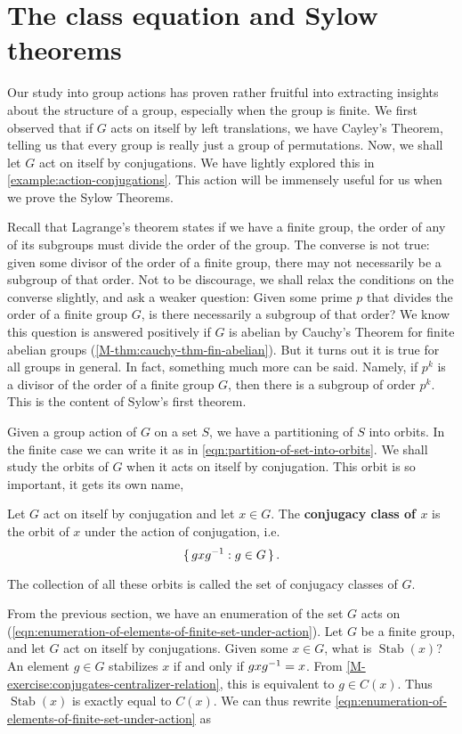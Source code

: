\documentclass[./main.tex]{subfiles}
\begin{document}
\section{The class equation and Sylow theorems}
Our study into group actions has proven rather fruitful into extracting insights
about the structure of a group, especially when the group is finite. We first
observed that if $G$ acts on itself by left translations, we have Cayley's
Theorem, telling us that every group is really just a group of permutations.
Now, we shall let $G$ act on itself by conjugations. We have lightly explored
this in \cref{example:action-conjugations}. This action will be immensely useful
for us when we prove the Sylow Theorems. 

Recall that Lagrange's theorem states if we have a finite group, the order of
any of its subgroups must divide the order of the group. The converse is not
true: given some divisor of the order of a finite group, there may not
necessarily be a subgroup of that order. Not to be discourage, we shall relax
the conditions on the converse slightly, and ask a weaker question: Given some
prime $p$ that divides the order of a finite group $G$, is there necessarily a
subgroup of that order? We know this question is answered positively if $G$ is
abelian by Cauchy's Theorem for finite abelian groups
(\cref{M-thm:cauchy-thm-fin-abelian}). But it turns out it is true for all groups
in general. In fact, something much more can be said. Namely, if $p^k$ is a
divisor of the order of a finite group $G$, then there is a subgroup of order
$p^k$. This is the content of Sylow's first theorem.

Given a group action of $G$ on a set $S$, we have a partitioning of $S$ into
orbits. In the finite case we can write it as in
\cref{eqn:partition-of-set-into-orbits}. We shall study the orbits of $G$ when
it acts on itself by conjugation. This orbit is so important, it gets its own name,
\begin{definition}
\label{def:conjugacy-class}
    Let $G$ act on itself by conjugation and let $x \in G$. The
    \textbf{conjugacy class of $x$} is the orbit of $x$ under the action of
    conjugation, i.e. 
    \[
        \set{gxg^{-1}: g \in G}.
    \]
\end{definition}
The collection of all these orbits is called the set of conjugacy classes of
$G$.

From the previous section, we have an enumeration of the set $G$ acts on
(\cref{eqn:enumeration-of-elements-of-finite-set-under-action}). Let $G$ be a
finite group, and let $G$ act on itself by conjugations. Given some $x \in G$,
what is $\operatorname{Stab}(x)$? An element $g \in G$ stabilizes $x$ if and
only if $gxg^{-1} = x$. From \cref{M-exercise:conjugates-centralizer-relation},
this is equivalent to $g \in C(x)$. Thus $\operatorname{Stab}(x)$ is exactly
equal to $C(x)$. We can thus rewrite
\cref{eqn:enumeration-of-elements-of-finite-set-under-action} as 
\end{document}
